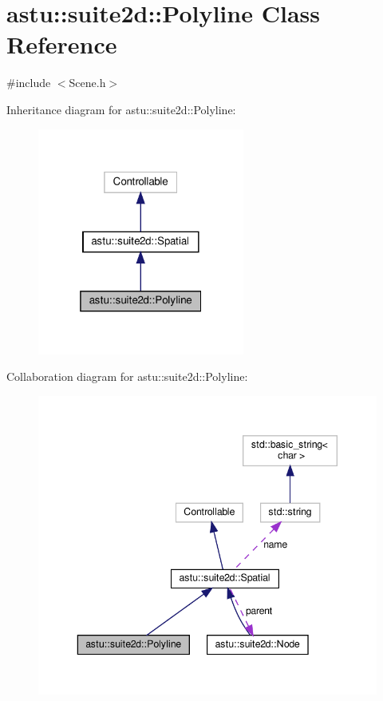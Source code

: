\hypertarget{classastu_1_1suite2d_1_1Polyline}{}\section{astu\+:\+:suite2d\+:\+:Polyline Class Reference}
\label{classastu_1_1suite2d_1_1Polyline}


{\ttfamily \#include $<$Scene.\+h$>$}



Inheritance diagram for astu\+:\+:suite2d\+:\+:Polyline\+:\nopagebreak
\begin{figure}[H]
\begin{center}
\leavevmode
\includegraphics[width=193pt]{classastu_1_1suite2d_1_1Polyline__inherit__graph}
\end{center}
\end{figure}


Collaboration diagram for astu\+:\+:suite2d\+:\+:Polyline\+:\nopagebreak
\begin{figure}[H]
\begin{center}
\leavevmode
\includegraphics[width=343pt]{classastu_1_1suite2d_1_1Polyline__coll__graph}
\end{center}
\end{figure}
